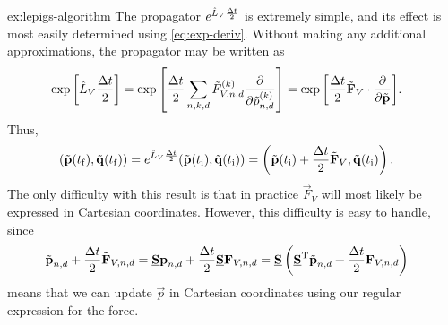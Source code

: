 \begin{DefAnswer}{ex:lepigs-algorithm}
	The propagator $e^{\hat{L}_V \frac{\Delta t}{2}}$ is extremely simple, and its effect is most easily determined using \cref{eq:exp-deriv}.
	Without making any additional approximations, the propagator may be written as
	\begin{align}
		\exp{\left[ \hat{L}_V \frac{\Delta t}{2} \right]}
		&= \exp{\left[ \frac{\Delta t}{2} \sum_{n,k,d} \tilde{F}_{V,n,d}^{(k)} \frac{\partial}{\partial \tilde{p}_{n,d}^{(k)}} \right]}
		= \exp{\left[ \frac{\Delta t}{2} \tilde{\bm{\mathbf{F}}}_{V} \cdot \frac{\partial}{\partial \tilde{\bm{\mathbf{p}}}} \right]}.
	\end{align}
	Thus,
	\begin{align}
		(\tilde{\bm{\mathbf{p}}}(t_\mathrm{f}), \tilde{\bm{\mathbf{q}}}(t_\mathrm{f}))
		&= e^{\hat{L}_V \frac{\Delta t}{2}} (\tilde{\bm{\mathbf{p}}}(t_\mathrm{i}), \tilde{\bm{\mathbf{q}}}(t_\mathrm{i}))
		= \left( \tilde{\bm{\mathbf{p}}}(t_\mathrm{i}) + \frac{\Delta t}{2} \tilde{\bm{\mathbf{F}}}_V, \tilde{\bm{\mathbf{q}}}(t_\mathrm{i}) \right).
	\end{align}
	The only difficulty with this result is that in practice $\vec{F}_V$ will most likely be expressed in Cartesian coordinates.
	However, this difficulty is easy to handle, since
	\begin{align}
		\tilde{\bm{\mathbf{p}}}_{n,d} + \frac{\Delta t}{2} \tilde{\bm{\mathbf{F}}}_{V,n,d}
		&= \underline{\bm{\mathbf{S}}} \bm{\mathbf{p}}_{n,d} + \frac{\Delta t}{2} \underline{\bm{\mathbf{S}}} \bm{\mathbf{F}}_{V,n,d}
		= \underline{\bm{\mathbf{S}}} \left( \underline{\bm{\mathbf{S}}}^\mathrm{T} \tilde{\bm{\mathbf{p}}}_{n,d} + \frac{\Delta t}{2} \bm{\mathbf{F}}_{V,n,d} \right)
	\end{align}
	means that we can update $\vec{p}$ in Cartesian coordinates using our regular expression for the force.


\end{DefAnswer}

